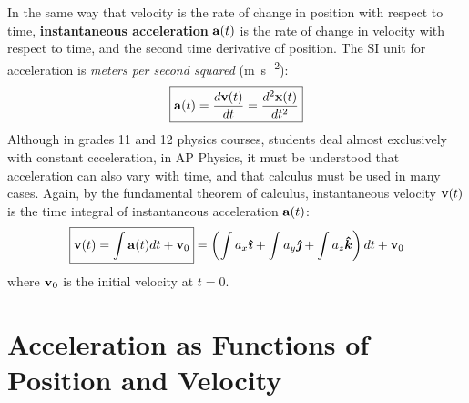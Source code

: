 \documentclass{../../../oss-handout}
\newcommand{\mb}[1]{\ensuremath\mathbf{#1}}
\begin{document}
In the same way that velocity is the rate of change in position with respect
to time, \textbf{instantaneous acceleration} $\mb{a}(t)$ is the rate of change
in velocity with respect to time, and the second time derivative of position.
The SI unit for acceleration is \emph{meters per second squared}
(\si{\metre\per\second^2}):
\begin{equation}
  \boxed{\mb{a}(t)= \frac{d\mb{v}(t)}{dt}=\frac{d^2\mb{x}(t)}{dt^2}}
\end{equation}
Although in grades 11 and 12 physics courses, students deal almost exclusively
with constant ccceleration, in AP Physics, it must be understood that
acceleration can also vary with time, and that calculus must be used in many
cases.
Again, by the fundamental theorem of calculus, instantaneous velocity
$\mb{v}(t)$ is the time integral of instantaneous acceleration $\mb{a}(t)$:
\begin{equation}
  \boxed{\mb{v}(t)=\int\mb{a}(t)dt+\mb{v}_0} =
    \left(\int a_x\bm{\hat{\imath}} +
    \int a_y\bm{\hat{\jmath}} +
    \int a_z\bm{\hat{k}}\right) dt +\mb{v}_0
\end{equation}
where $\mb{v}_0$ is the initial velocity at $t=0$.

\section{Acceleration as Functions of Position and Velocity}
\end{document}
